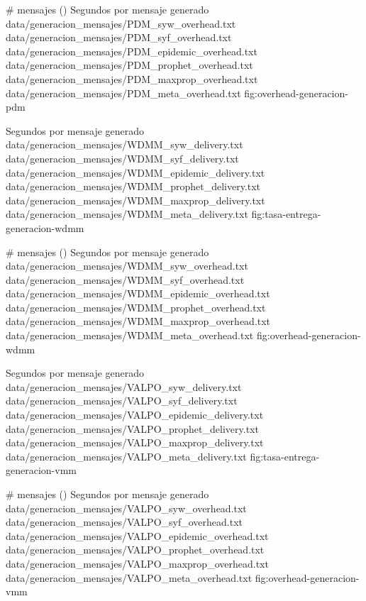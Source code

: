 {
\graficoProtocolos
{\# mensajes (\overhead)}
{Segundos por mensaje generado}
{data/generacion_mensajes/PDM_syw_overhead.txt}
{data/generacion_mensajes/PDM_syf_overhead.txt}
{data/generacion_mensajes/PDM_epidemic_overhead.txt}
{data/generacion_mensajes/PDM_prophet_overhead.txt}
{data/generacion_mensajes/PDM_maxprop_overhead.txt}
{data/generacion_mensajes/PDM_meta_overhead.txt}
}{fig:overhead-generacion-pdm}


{
\graficoDeliveryProtocolos
{Segundos por mensaje generado}
{data/generacion_mensajes/WDMM_syw_delivery.txt}
{data/generacion_mensajes/WDMM_syf_delivery.txt}
{data/generacion_mensajes/WDMM_epidemic_delivery.txt}
{data/generacion_mensajes/WDMM_prophet_delivery.txt}
{data/generacion_mensajes/WDMM_maxprop_delivery.txt}
{data/generacion_mensajes/WDMM_meta_delivery.txt}
}{fig:tasa-entrega-generacion-wdmm}

{
\graficoProtocolos
{\# mensajes (\overhead)}
{Segundos por mensaje generado}
{data/generacion_mensajes/WDMM_syw_overhead.txt}
{data/generacion_mensajes/WDMM_syf_overhead.txt}
{data/generacion_mensajes/WDMM_epidemic_overhead.txt}
{data/generacion_mensajes/WDMM_prophet_overhead.txt}
{data/generacion_mensajes/WDMM_maxprop_overhead.txt}
{data/generacion_mensajes/WDMM_meta_overhead.txt}
}{fig:overhead-generacion-wdmm}

{
\graficoDeliveryProtocolos
{Segundos por mensaje generado}
{data/generacion_mensajes/VALPO_syw_delivery.txt}
{data/generacion_mensajes/VALPO_syf_delivery.txt}
{data/generacion_mensajes/VALPO_epidemic_delivery.txt}
{data/generacion_mensajes/VALPO_prophet_delivery.txt}
{data/generacion_mensajes/VALPO_maxprop_delivery.txt}
{data/generacion_mensajes/VALPO_meta_delivery.txt}
}{fig:tasa-entrega-generacion-vmm}

{
\graficoProtocolos
{\# mensajes (\overhead)}
{Segundos por mensaje generado}
{data/generacion_mensajes/VALPO_syw_overhead.txt}
{data/generacion_mensajes/VALPO_syf_overhead.txt}
{data/generacion_mensajes/VALPO_epidemic_overhead.txt}
{data/generacion_mensajes/VALPO_prophet_overhead.txt}
{data/generacion_mensajes/VALPO_maxprop_overhead.txt}
{data/generacion_mensajes/VALPO_meta_overhead.txt}
}{fig:overhead-generacion-vmm}


